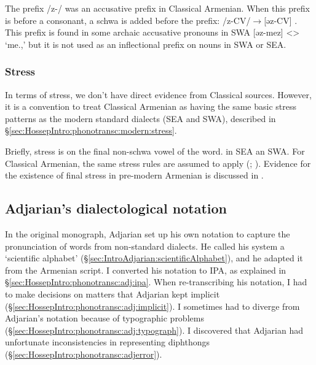 The prefix /z-/ was an accusative prefix in Classical Armenian. When this prefix is before a consonant, a schwa is added before the prefix: /z-CV/$\rightarrow$[əz-CV] \citep[116]{Thomson-1989-IntroClassicalArmenian}. This prefix   is found in some archaic accusative pronouns in SWA [əz-mez] <> `me.{\acc},' but it is not used as an inflectional prefix on nouns in  SWA or SEA. 




\subsubsection{Stress}\label{sec:HossepIntro:phonotransc:CA:stress}

 
In terms of stress, we don't have direct evidence from Classical sources. However, it is a convention to treat Classical Armenian as having the same basic stress patterns as the modern standard dialects (SEA and SWA), described in \S\ref{sec:HossepIntro:phonotransc:modern:stress}. 

Briefly, stress  is on the final non-schwa vowel of the word. in SEA an SWA. For Classical Armenian, the same stress rules are assumed to apply (\citealt[15]{Thomson-1989-IntroClassicalArmenian}; \citealt[1043-4]{Macak-2017-PhonoClassicalArmenian}). Evidence for the existence of final stress in pre-modern Armenian is discussed in \citet{DeLisi-2018-ArmenianProsodyDiachrony}.





\subsection{Adjarian's dialectological notation}\label{sec:HossepIntro:phonotransc:adj}


In the original monograph, Adjarian set up his own notation to capture the pronunciation of words from  non-standard dialects. He called his system a `scientific alphabet'  (\S\ref{sec:IntroAdjarian:scientificAlphabet}), and he adapted it from the Armenian script. I converted his notation to IPA, as explained in \S\ref{sec:HossepIntro:phonotransc:adj:ipa}. When re-transcribing his notation, I had to make decisions on matters that Adjarian kept implicit (\S\ref{sec:HossepIntro:phonotransc:adj:implicit}). I sometimes had to diverge from Adjarian's notation because of   typographic problems (\S\ref{sec:HossepIntro:phonotransc:adj:typograph}). I discovered that Adjarian had unfortunate inconsistencies in representing diphthongs (\S\ref{sec:HossepIntro:phonotransc:adjerror}). 


